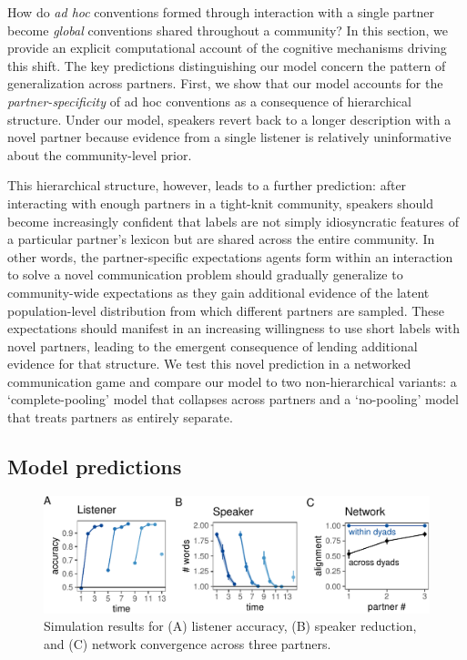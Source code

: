 
How do \emph{ad hoc} conventions formed through interaction with a single partner become \emph{global} conventions shared throughout a community?
In this section, we provide an explicit computational account of the cognitive mechanisms driving this shift.
The key predictions distinguishing our model concern the pattern of generalization across partners.
First, we show that our model accounts for the \emph{partner-specificity} of ad hoc conventions as a consequence of hierarchical structure. 
Under our model, speakers revert back to a longer description with a novel partner because evidence from a single listener is relatively uninformative about the community-level prior.

This hierarchical structure, however, leads to a further prediction: after interacting with enough partners in a tight-knit community, speakers should become increasingly confident that labels are not simply idiosyncratic features of a particular partner's lexicon but are shared across the entire community.
In other words, the partner-specific expectations agents form within an interaction to solve a novel communication problem should gradually generalize to community-wide expectations as they gain additional evidence of the latent population-level distribution from which different partners are sampled.
These expectations should manifest in an increasing willingness to use short labels with novel partners, leading to the emergent consequence of lending additional evidence for that structure. 
We test this novel prediction in a networked communication game and compare our model to two non-hierarchical variants: a `complete-pooling' model that collapses across partners and a `no-pooling' model that treats partners as entirely separate.

\subsection{Model predictions}

\begin{figure}
\includegraphics[scale=1]{./figures/sec3-model_results.pdf}
\caption{Simulation results for (A) listener accuracy, (B) speaker reduction, and (C) network convergence across three partners.}
\label{fig:model_results}
\end{figure}

